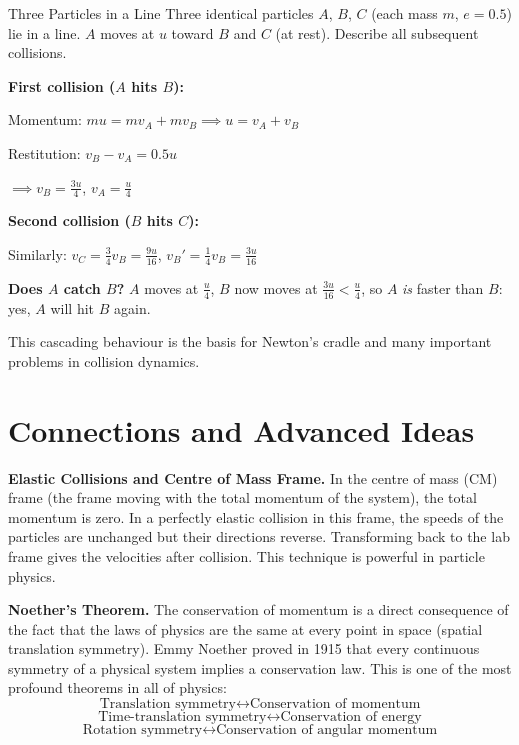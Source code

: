 \documentclass[12pt, a4paper]{book}
\begin{document}
\begin{exmp}{Three Particles in a Line}{}
Three identical particles $A$, $B$, $C$ (each mass $m$, $e = 0.5$) lie in a line. $A$ moves at $u$ toward $B$ and $C$ (at rest). Describe all subsequent collisions.

\medskip
\textbf{First collision ($A$ hits $B$):}

Momentum: $mu = mv_A + mv_B \implies u = v_A + v_B$

Restitution: $v_B - v_A = 0.5u$

$\implies v_B = \frac{3u}{4}$, $v_A = \frac{u}{4}$

\textbf{Second collision ($B$ hits $C$):}

Similarly: $v_C = \frac{3}{4}v_B = \frac{9u}{16}$, $v_B' = \frac{1}{4}v_B = \frac{3u}{16}$

\textbf{Does $A$ catch $B$?} $A$ moves at $\frac{u}{4}$, $B$ now moves at $\frac{3u}{16} < \frac{u}{4}$, so $A$ \emph{is} faster than $B$: yes, $A$ will hit $B$ again.

This cascading behaviour is the basis for Newton's cradle and many important problems in collision dynamics.
\end{exmp}

\section{Connections and Advanced Ideas}

\begin{explorationbox}
\textbf{Elastic Collisions and Centre of Mass Frame.}
In the centre of mass (CM) frame (the frame moving with the total momentum of the system), the total momentum is zero. In a perfectly elastic collision in this frame, the speeds of the particles are unchanged but their directions reverse. Transforming back to the lab frame gives the velocities after collision. This technique is powerful in particle physics.
\end{explorationbox}

\begin{explorationbox}
\textbf{Noether's Theorem.}
The conservation of momentum is a direct consequence of the fact that the laws of physics are the same at every point in space (spatial translation symmetry). Emmy Noether proved in 1915 that every continuous symmetry of a physical system implies a conservation law. This is one of the most profound theorems in all of physics:
\[
\text{Translation symmetry} \leftrightarrow \text{Conservation of momentum}
\]
\[
\text{Time-translation symmetry} \leftrightarrow \text{Conservation of energy}
\]
\[
\text{Rotation symmetry} \leftrightarrow \text{Conservation of angular momentum}
\]
\end{explorationbox}
\end{document}
